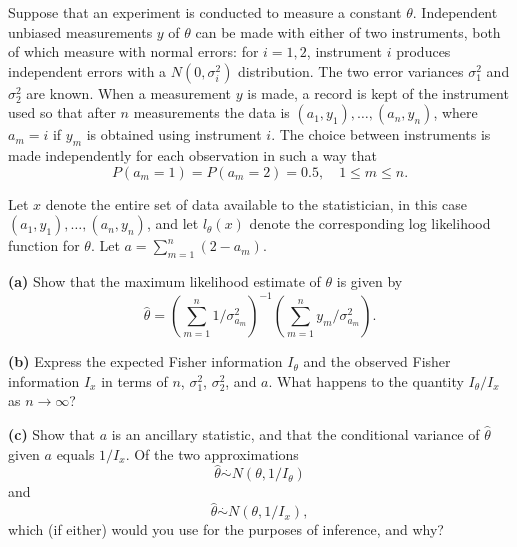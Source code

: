 \begin{exercise}\label{probability:2011:6}
Suppose that an experiment is conducted to measure a constant $\theta$. Independent unbiased measurements $y$ of $\theta$ can be made with either of two instruments, both of which measure with normal errors: for $i = 1, 2$, instrument $i$ produces independent errors with a $N(0, \sigma_i^2)$ distribution. The two error variances $\sigma_1^2$ and $\sigma_2^2$ are known. When a measurement $y$ is made, a record is kept of the instrument used so that after $n$ measurements the data is $(a_1, y_1), \dotsc, (a_n, y_n)$, where $a_m = i$ if $y_m$ is obtained using instrument $i$. The choice between instruments is made independently for each observation in such a way that
\[
P(a_m = 1) = P(a_m = 2) = 0.5, \quad 1 \leq m \leq n.
\]

Let $x$ denote the entire set of data available to the statistician, in this case $(a_1, y_1), \dotsc, (a_n, y_n)$, and let $l_\theta(x)$ denote the corresponding log likelihood function for $\theta$. Let $a = \sum_{m=1}^n (2 - a_m)$.

\textbf{(a)} Show that the maximum likelihood estimate of $\theta$ is given by
\[
\hat{\theta} = \left(\sum_{m=1}^n 1/\sigma_{a_m}^2\right)^{-1} \left(\sum_{m=1}^n y_m/\sigma_{a_m}^2\right).
\]

\textbf{(b)} Express the expected Fisher information $I_\theta$ and the observed Fisher information $I_x$ in terms of $n$, $\sigma_1^2$, $\sigma_2^2$, and $a$. What happens to the quantity $I_\theta / I_x$ as $n \to \infty$?

\textbf{(c)} Show that $a$ is an ancillary statistic, and that the conditional variance of $\hat{\theta}$ given $a$ equals $1/I_x$. Of the two approximations
\[
\hat{\theta} \stackrel{.}{\sim} N(\theta, 1/I_\theta)
\]
and
\[
\hat{\theta} \stackrel{.}{\sim} N(\theta, 1/I_x),
\]
which (if either) would you use for the purposes of inference, and why?
\end{exercise}

